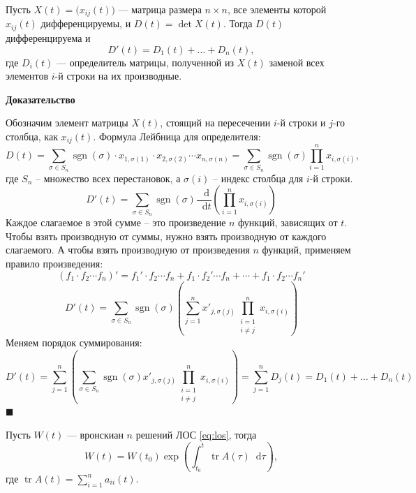 \documentclass[12pt,a4paper]{article}
\numberwithin{equation}{section}
\newcommand{\tr}{\operatorname{tr}}
\newcommand{\dd}{\mathop{}\!\mathrm{d}}
\renewenvironment{proof}[1][Доказательство]{\begin{center}\textbf{#1}\end{center}}{\hfill$\blacksquare$\par}
\begin{document}
\begin{lemmaHSE}
Пусть $X(t)=\bigl(x_{ij}(t)\bigr)$ --- матрица размера $n\times n$, все элементы которой $x_{ij}(t)$ дифференцируемы, и $D(t)=\det X(t)$. Тогда $D(t)$ дифференцируема и
\[
D'(t)=D_1(t)+\ldots+D_n(t),
\]
где $D_i(t)$ --- определитель матрицы, полученной из $X(t)$ заменой всех элементов $i$-й строки на их производные.
\end{lemmaHSE}
\begin{proof}
Обозначим элемент матрицы \(X(t)\), стоящий на пересечении \(i\)-й строки и \(j\)-го столбца, как \(x_{ij}(t)\). Формула Лейбница для определителя:
\[D(t) = \sum_{\sigma \in S_n} \operatorname{sgn}(\sigma) \cdot x_{1,\sigma(1)} \cdot x_{2,\sigma(2)} \cdots x_{n,\sigma(n)}=\sum_{\sigma \in S_n} \operatorname{sgn}(\sigma) \prod_{i=1}^{n} x_{i, \sigma(i)},\]
где \(S_n\) -- множество всех перестановок, а \(\sigma(i)\) -- индекс столбца для \(i\)-й строки.
\[D'(t)=\sum_{\sigma \in S_n} \operatorname{sgn}(\sigma)\frac{\dd}{\dd t}\left(\prod_{i=1}^{n} x_{i, \sigma(i)}\right)\]
Каждое слагаемое в этой сумме -- это произведение \(n\) функций, зависящих от \(t\). Чтобы взять производную от суммы, нужно взять производную от каждого слагаемого. А чтобы взять производную от произведения \(n\) функций, применяем правило произведения:
\[(f_1 \cdot f_2 \cdots f_n)' = f_1' \cdot f_2 \cdots f_n + f_1 \cdot f_2' \cdots f_n + \cdots + f_1 \cdot f_2 \cdots f_n'\]
\[D'(t) = \sum_{\sigma \in S_n} \operatorname{sgn}(\sigma) \left( \sum_{j=1}^n x'_{j,\sigma(j)} \prod_{\substack{i=1 \\ i \neq j}}^n x_{i,\sigma(i)} \right)\]
Меняем порядок суммирования:
\[D'(t) = \sum_{j=1}^{n} \left( \sum_{\sigma \in S_n} \operatorname{sgn}(\sigma) x'_{j,\sigma(j)} \prod_{\substack{i=1 \\ i \neq j}}^{n} x_{i,\sigma(i)} \right)= \sum_{j=1}^{n}D_j(t)=D_1(t)+\ldots+D_n(t)\]
\end{proof}
\begin{theoremHSE}
Пусть $W(t)$ --- вронскиан $n$ решений ЛОС \eqref{eq:los}, тогда
\begin{equation}
W(t)=W(t_0)\exp\left(\int_{t_0}^{t}\tr A(\tau)\dd\tau\right),
\label{eq:liouville-system}
\end{equation}
где \(\displaystyle\tr A(t)=\sum_{i=1}^{n}a_{ii}(t)\).
\end{theoremHSE}
\end{document}
